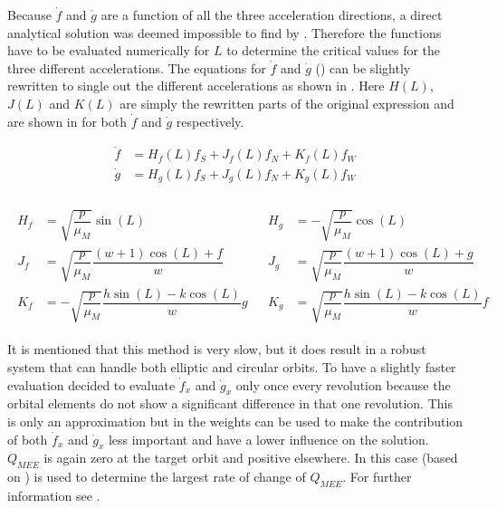 Because $\dot{f}$ and $\dot{g}$ are a function of all the three acceleration directions, a direct analytical solution was deemed impossible to find by \cite{gebbett2014multi}. Therefore the functions have to be evaluated numerically for $L$ to determine the critical values for the three different accelerations. The equations for $\dot{f}$ and $\dot{g}$ () can be slightly rewritten to single out the different accelerations as shown in . Here $H(L)$, $J(L)$ and $K(L)$ are simply the rewritten parts of the original expression and are shown in  for both $\dot{f}$ and $\dot{g}$ respectively.

\begin{equation} \label{eq:crit_fg}
\begin{split}
\dot{f}&=H_{f}(L)f_{S}+J_{f}(L)f_{N}+K_{f}(L)f_{W}\\
\dot{g}&=H_{g}(L)f_{S}+J_{g}(L)f_{N}+K_{g}(L)f_{W}\\
\end{split}
\end{equation}



\begin{align} \label{eq:HJK_fg}
\begin{split} 
H_{f}&=\sqrt{\dfrac{p}{\mu_{M}}}\sin\left(L\right)\\
J_{f}&=\sqrt{\dfrac{p}{\mu_{M}}}\dfrac{\left(w+1\right)\cos\left(L\right)+f}{w}\\
K_{f}&=-\sqrt{\dfrac{p}{\mu_{M}}}\dfrac{h\sin\left(L\right)-k\cos\left(L\right)}{w}g
\end{split} 
&
\begin{split}
H_{g}&=-\sqrt{\dfrac{p}{\mu_{M}}}\cos\left(L\right)\\
J_{g}&=\sqrt{\dfrac{p}{\mu_{M}}}\dfrac{\left(w+1\right)\cos\left(L\right)+g}{w}\\
K_{g}&=\sqrt{\dfrac{p}{\mu_{M}}}\dfrac{h\sin\left(L\right)-k\cos\left(L\right)}{w}f
\end{split}
\end{align}



It is mentioned that this method is very slow, but it does result in a robust system that can handle both elliptic and circular orbits. To have a slightly faster evaluation \cite{gebbett2014multi} decided to evaluate $\dot{f}_{x}$ and $\dot{g}_{x}$ only once every revolution because the orbital elements do not show a significant difference in that one revolution. This is only an approximation but in  the weights can be used to make the contribution of both $\dot{f}_{x}$ and $\dot{g}_{x}$ less important and have a lower influence on the solution. $Q_{MEE}$ is again zero at the target orbit and positive elsewhere. In this case  (based on ) is used to determine the largest rate of change of $Q_{MEE}$. For further information see \cite{gebbett2014multi}.


